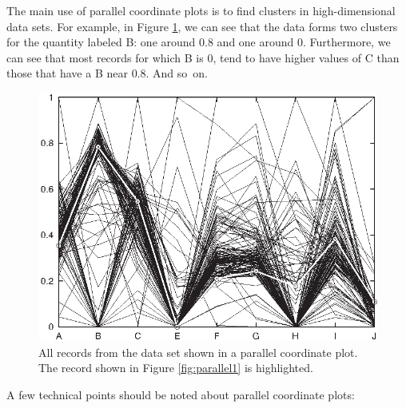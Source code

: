 The main use of parallel coordinate plots is to find clusters in
high-dimensional data sets. For example, in Figure \ref{fig:parallel2},
we can see that the data forms two clusters for the quantity labeled
B: one around $0.8$ and one around $0$. Furthermore, we can see that 
most records for which B is $0$, tend to have higher values of C 
than those that have a B near $0.8$. And so~on.

\begin{figure}
   \centerline{\includegraphics{img/parallel2}}
  \caption{All records from the data set shown in a parallel
    coordinate plot. The record shown in Figure \ref{fig:parallel1} is
    highlighted.}
  \label{fig:parallel2}\vspace*{-6pt}
\end{figure}

A few technical points should be noted about parallel coordinate
plots:

